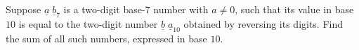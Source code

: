Suppose $\underline{a}\;\underline{b}_7$ is a two-digit base-$7$ number with $a\neq 0$, such that its value in base $10$ is equal to the two-digit number $\underline{b}\;\underline{a}_{10}$ obtained by reversing its digits. Find the sum of all such numbers, expressed in base $10$.
